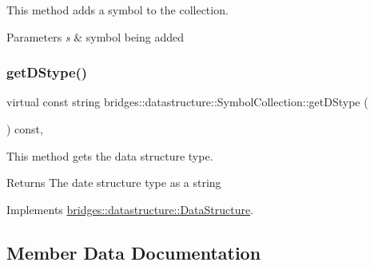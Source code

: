 This method adds a symbol to the collection. 


\begin{DoxyParams}{Parameters}
{\em s} & symbol being added \\
\hline
\end{DoxyParams}
\mbox{\label{classbridges_1_1datastructure_1_1_symbol_collection_a8f63c31a48a12127978967b706fc38f5}} 
\subsubsection{\texorpdfstring{get\+D\+Stype()}{getDStype()}}
{\footnotesize\ttfamily virtual const string bridges\+::datastructure\+::\+Symbol\+Collection\+::get\+D\+Stype (\begin{DoxyParamCaption}{ }\end{DoxyParamCaption}) const\hspace{0.3cm}{\ttfamily [inline]}, {\ttfamily [virtual]}}



This method gets the data structure type. 

\begin{DoxyReturn}{Returns}
The date structure type as a string 
\end{DoxyReturn}


Implements \mbox{\hyperlink{classbridges_1_1datastructure_1_1_data_structure_a4ff66cb34409f11fe9fc647f6d8a22ce}{bridges\+::datastructure\+::\+Data\+Structure}}.



\subsection{Member Data Documentation}
\mbox{\label{classbridges_1_1datastructure_1_1_symbol_collection_a5e14cae08319875f60d6bdf7f8c880ab}} 
